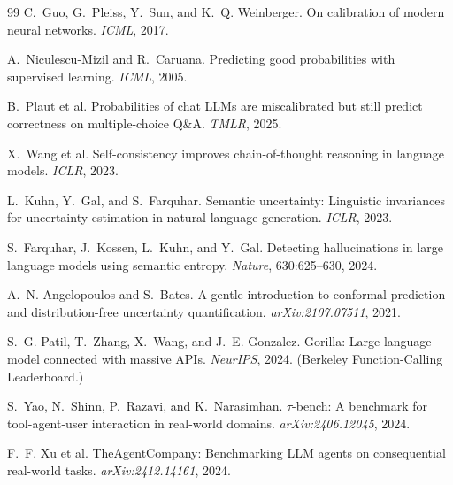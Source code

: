 \documentclass[10pt,twocolumn]{article}
\begin{document}
\begin{thebibliography}{99}
\small
{}
C.~Guo, G.~Pleiss, Y.~Sun, and K.~Q. Weinberger.
On calibration of modern neural networks.
\emph{ICML}, 2017.

A.~Niculescu-Mizil and R.~Caruana.
Predicting good probabilities with supervised learning.
\emph{ICML}, 2005.

B.~Plaut et al.
Probabilities of chat LLMs are miscalibrated but still predict correctness on
multiple-choice Q\&A.
\emph{TMLR}, 2025.

X.~Wang et al.
Self-consistency improves chain-of-thought reasoning in language models.
\emph{ICLR}, 2023.

L.~Kuhn, Y.~Gal, and S.~Farquhar.
Semantic uncertainty: Linguistic invariances for uncertainty estimation in
natural language generation.
\emph{ICLR}, 2023.

S.~Farquhar, J.~Kossen, L.~Kuhn, and Y.~Gal.
Detecting hallucinations in large language models using semantic entropy.
\emph{Nature}, 630:625--630, 2024.

A.~N. Angelopoulos and S.~Bates.
A gentle introduction to conformal prediction and distribution-free uncertainty
quantification.
\emph{arXiv:2107.07511}, 2021.

S.~G. Patil, T.~Zhang, X.~Wang, and J.~E. Gonzalez.
Gorilla: Large language model connected with massive APIs.
\emph{NeurIPS}, 2024. (Berkeley Function-Calling Leaderboard.)

S.~Yao, N.~Shinn, P.~Razavi, and K.~Narasimhan.
$\tau$-bench: A benchmark for tool-agent-user interaction in real-world domains.
\emph{arXiv:2406.12045}, 2024.

F.~F. Xu et al.
TheAgentCompany: Benchmarking LLM agents on consequential real-world tasks.
\emph{arXiv:2412.14161}, 2024.
\end{thebibliography}
\end{document}
